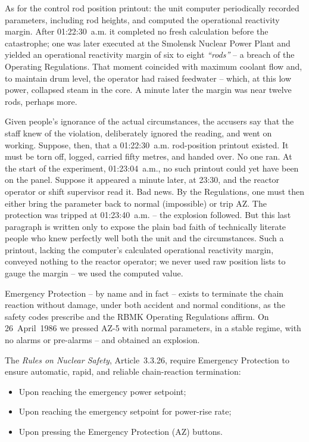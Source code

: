 \documentclass[openright]{bookest}
\begin{document}
As for the control rod position printout: the unit computer periodically recorded parameters, including rod heights, and computed the operational reactivity margin. After 01:22:30~a.m. it completed no fresh calculation before the catastrophe; one was later executed at the Smolensk Nuclear Power Plant and yielded an operational reactivity margin of six to eight \textit{``rods''} -- a breach of the Operating Regulations. That moment coincided with maximum coolant flow and, to maintain drum level, the operator had raised feedwater -- which, at this low power, collapsed steam in the core. A minute later the margin was near twelve rods, perhaps more.

Given people's ignorance of the actual circumstances, the accusers say that the staff knew of the violation, deliberately ignored the reading, and went on working. Suppose, then, that a 01:22:30~a.m. rod-position printout existed. It must be torn off, logged, carried fifty metres, and handed over. No one ran. At the start of the experiment, 01:23:04~a.m., no such printout could yet have been on the panel. Suppose it appeared a minute later, at 23:30, and the reactor operator or shift supervisor read it. Bad news. By the Regulations, one must then either bring the parameter back to normal (impossible) or trip AZ. The protection was tripped at 01:23:40~a.m. -- the explosion followed. But this last paragraph is written only to expose the plain bad faith of technically literate people who knew perfectly well both the unit and the circumstances. Such a printout, lacking the computer's calculated operational reactivity margin, conveyed nothing to the reactor operator; we never used raw position lists to gauge the margin -- we used the computed value.

Emergency Protection -- by name and in fact -- exists to terminate the chain reaction without damage, under both accident and normal conditions, as the safety codes prescribe and the RBMK Operating Regulations affirm. On 26~April~1986 we pressed AZ-5 with normal parameters, in a stable regime, with no alarms or pre-alarms -- and obtained an explosion.

The \textit{Rules on Nuclear Safety}, Article~3.3.26, require Emergency Protection to ensure automatic, rapid, and reliable chain-reaction termination:

\begin{itemize}
\item Upon reaching the emergency power setpoint;
\item Upon reaching the emergency setpoint for power-rise rate;
\item Upon pressing the Emergency Protection (AZ) buttons.
\end{itemize}
\end{document}
